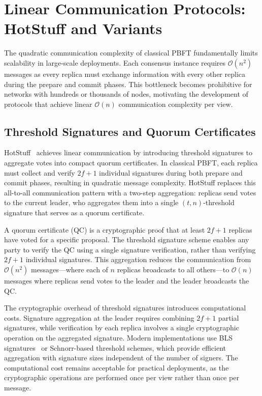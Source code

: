 \section{Linear Communication Protocols: HotStuff and Variants}

The quadratic communication complexity of classical PBFT fundamentally limits scalability in large-scale deployments. Each consensus instance requires $\mathcal{O}(n^2)$ messages as every replica must exchange information with every other replica during the prepare and commit phases. This bottleneck becomes prohibitive for networks with hundreds or thousands of nodes, motivating the development of protocols that achieve linear $\mathcal{O}(n)$ communication complexity per view.

\subsection{Threshold Signatures and Quorum Certificates}

HotStuff~\cite{yin2019hotstuff} achieves linear communication by introducing threshold signatures to aggregate votes into compact quorum certificates. In classical PBFT, each replica must collect and verify $2f+1$ individual signatures during both prepare and commit phases, resulting in quadratic message complexity. HotStuff replaces this all-to-all communication pattern with a two-step aggregation: replicas send votes to the current leader, who aggregates them into a single $(t, n)$-threshold signature that serves as a quorum certificate.

A quorum certificate (QC) is a cryptographic proof that at least $2f+1$ replicas have voted for a specific proposal. The threshold signature scheme enables any party to verify the QC using a single signature verification, rather than verifying $2f+1$ individual signatures. This aggregation reduces the communication from $\mathcal{O}(n^2)$ messages—where each of $n$ replicas broadcasts to all others—to $\mathcal{O}(n)$ messages where replicas send votes to the leader and the leader broadcasts the QC.

The cryptographic overhead of threshold signatures introduces computational costs. Signature aggregation at the leader requires combining $2f+1$ partial signatures, while verification by each replica involves a single cryptographic operation on the aggregated signature. Modern implementations use BLS signatures~\cite{boneh2001short} or Schnorr-based threshold schemes, which provide efficient aggregation with signature sizes independent of the number of signers. The computational cost remains acceptable for practical deployments, as the cryptographic operations are performed once per view rather than once per message.


